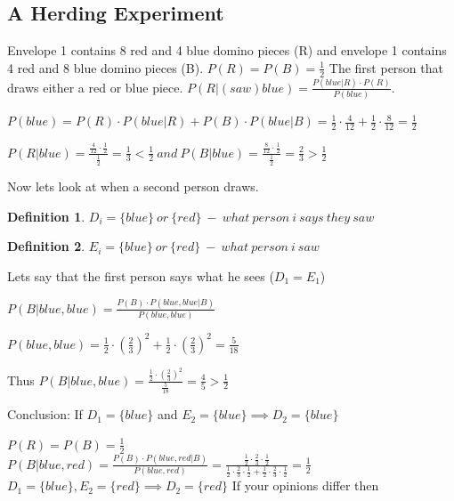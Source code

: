 \documentclass[12pt]{scrartcl}
\newtheorem{defi}{Definition}
\begin{document}
\subsection{A Herding Experiment}
Envelope 1 contains 8 red and 4 blue domino pieces (R) and envelope 1 contains 4 red and 8 blue domino pieces (B).\newline
$P(R) = P(B) = \frac{1}{2} $\newline
The first person that draws either a red or blue piece.\newline
$P(R | (saw) blue) = \frac{P(blue | R)\cdot P(R)}{P(blue)}$.

\noindent$P(blue) = P(R)\cdot P(blue |R) + P(B)\cdot P(blue | B) = \frac{1}{2}\cdot \frac{4}{12} + \frac{1}{2}\cdot \frac{8}{12} = \frac{1}{2}$

\noindent$P(R | blue) = \frac{\frac{4}{12}\cdot \frac{1}{2}}{\frac{1}{2}} = \frac{1}{3} < \frac{1}{2}\
 and\ P(B | blue) = \frac{\frac{8}{12}\cdot \frac{1}{2}}{\frac{1}{2}} = \frac{2}{3} > \frac{1}{2}$



\noindent Now lets look at when a second person draws.
\begin{defi}
	$D_{i} = \{blue\}\ or\ \{red\}\ -\ what\ person\ i\ says\ they\ saw$
\end{defi}
\begin{defi}
$E_{i} = \{blue\}\ or\ \{red\}\ -\ what\ person\ i\ saw$
\end{defi}
\noindent Lets say that the first person says what he sees ($D_{1} = E_{1}$)

\noindent$P(B | blue, blue) = \frac{P(B)\cdot P(blue, blue | B)}{P(blue, blue)}$

\noindent$P(blue, blue) = \frac{1}{2}\cdot (\frac{2}{3})^{2} + \frac{1}{2}\cdot (\frac{2}{3})^{2} = \frac{5}{18}$

\noindent Thus $P(B | blue, blue) = \frac{\frac{1}{2}\cdot (\frac{2}{3})^{2}}{\frac{5}{18}} = \frac{4}{5} > \frac{1}{2}$

\noindent Conclusion: If $D_{1} = \{blue\}$ and $E_{2} = \{blue\} \implies D_{2} = \{blue \}$\newline

\noindent $P(R) = P(B) = \frac{1}{2}$\\
$P(B | blue, red) = \frac{P(B)\cdot P(blue, red | B)}{P(blue, red)} = \frac{\frac{1}{2}\cdot \frac{2}{3}\cdot \frac{1}{2}}{ \frac{1}{2}\cdot \frac{2}{3}\cdot \frac{1}{2} + \frac{1}{2}\cdot \frac{2}{3}\cdot \frac{1}{2}} = \frac{1}{2}$\\
$D_{1} = \{blue\}, E_{2} = \{red\} \implies D_{2} = \{red\}$
If your opinions differ then
\end{document}
